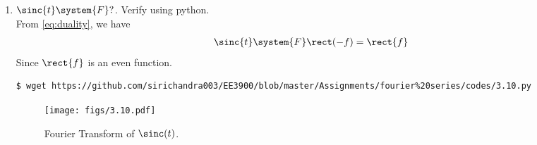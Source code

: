 \documentclass[journal,12pt,twocolumn]{IEEEtran}
\renewcommand\thesection{\arabic{section}}
\begin{document}
\begin{enumerate}[label=\thesection.\arabic*
,ref=\thesection.\theenumi]
\item
$     \sinc{t}\system{F} ?$. Verify using python.\\
\solution From \eqref{eq:duality}, we have
\begin{align}
\sinc{t}\system{F}\rect(-f)=\rect{f}
\label{eq:fourier-sinc}
\end{align}
Since $\rect{f}$ is an even function.
\begin{lstlisting}
$ wget https://github.com/sirichandra003/EE3900/blob/master/Assignments/fourier%20series/codes/3.10.py
\end{lstlisting}
\begin{figure}[!ht]
\texttt{[image: figs/3.10.pdf]}
\caption{Fourier Transform of $\sinc(t)$.}
\label{eq:fig-fourier-sinc}
\end{figure}
\end{enumerate}
\end{document}

